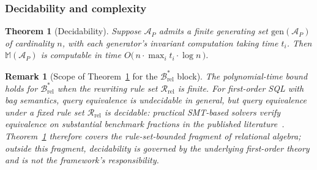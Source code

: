 \documentclass[acmsmall, screen]{acmart}
\newtheorem{theorem}{Theorem}
\newtheorem{remark}{Remark}
\begin{document}
\subsubsection{Decidability and complexity}
\label{subsec:decidability}

\begin{theorem}[Decidability]
\label{thm:decidable}
Suppose $\mathcal{A}_P$ admits a finite generating set $\mathrm{gen}(\mathcal{A}_P)$ of cardinality $n$, with each generator's invariant computation taking time $t_i$. Then $\mathbb{M}(\mathcal{A}_P)$ is computable in time $O\!\bigl(\,n \cdot \max_i t_i \cdot \log n\,\bigr)$.
\end{theorem}

\begin{remark}[Scope of Theorem~\ref{thm:decidable} for the $\mathcal{B}^{*}_{\mathrm{rel}}$ block]
\label{rem:decidable-brel}
The polynomial-time bound holds for $\mathcal{B}^{*}_{\mathrm{rel}}$ when the rewriting rule set $\mathcal{R}_{\mathrm{rel}}$ is finite. For first-order SQL with bag semantics, query equivalence is undecidable in general, but \emph{query equivalence under a fixed rule set $\mathcal{R}_{\mathrm{rel}}$} is decidable: practical SMT-based solvers verify equivalence on substantial benchmark fractions in the published literature~\cite{Wang2024QED, Zhou2022SPES}. Theorem~\ref{thm:decidable} therefore covers the rule-set-bounded fragment of relational algebra; outside this fragment, decidability is governed by the underlying first-order theory and is not the framework's responsibility.
\end{remark}
\end{document}
